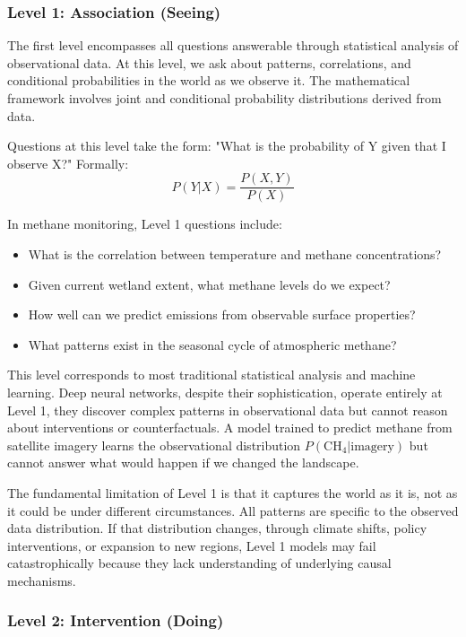 \subsubsection{Level 1: Association (Seeing)}

The first level encompasses all questions answerable through statistical analysis of observational data. At this level, we ask about patterns, correlations, and conditional probabilities in the world as we observe it. The mathematical framework involves joint and conditional probability distributions derived from data.

Questions at this level take the form: "What is the probability of Y given that I observe X?" Formally:
\begin{equation}
P(Y|X) = \frac{P(X,Y)}{P(X)}
\end{equation}

In methane monitoring, Level 1 questions include:
\begin{itemize}
\item What is the correlation between temperature and methane concentrations?
\item Given current wetland extent, what methane levels do we expect?
\item How well can we predict emissions from observable surface properties?
\item What patterns exist in the seasonal cycle of atmospheric methane?
\end{itemize}

This level corresponds to most traditional statistical analysis and machine learning. Deep neural networks, despite their sophistication, operate entirely at Level 1, they discover complex patterns in observational data but cannot reason about interventions or counterfactuals. A model trained to predict methane from satellite imagery learns the observational distribution $P(\text{CH}_4|\text{imagery})$ but cannot answer what would happen if we changed the landscape.

The fundamental limitation of Level 1 is that it captures the world as it is, not as it could be under different circumstances. All patterns are specific to the observed data distribution. If that distribution changes, through climate shifts, policy interventions, or expansion to new regions, Level 1 models may fail catastrophically because they lack understanding of underlying causal mechanisms.

\subsubsection{Level 2: Intervention (Doing)}

